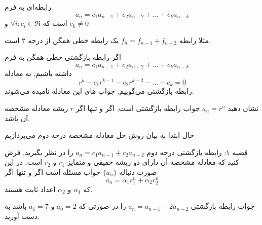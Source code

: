 \renewcommand{\thefootnote}{\arabic{footnote}}

\begin{definition}
    رابطه‌ای به فرم
   \[a_n=c_{1}a_{n-1}+c_{2}a_{n-2}+...+c_{k}a_{n-k}\]
   است که
   $\forall{i}:c_i \in \Re $
   و 
   $ c_k\neq 0$


\end{definition}

مثلا رابطه‌ 
$f_n=f_{n-1}+f_{n-2}$
یک رابطه‌ خطی همگن از درجه ۲ است.

\begin{definition}
    اگر رابطه‌ بازگشتی خطی همگن به فرم
    \[a_n=c_{1}a_{n-1}+c_{2}a_{n-2}+...+c_{k}a_{n-k}\]
    داشته باشیم, به معادله
    \[r^k-c_{1}r^{k-1}-c_{2}r^{k-2}-...-c_{k}=0\]
    رابطه‌ بازگشتی می‌گوییم.
     جواب های این معادله 
    نامیده می‌شوند.

\end{definition}
\begin{problem}
    نشان دهید
    $a_n=r^n$
    جواب رابطه‌ بازگشتی است, اگر و تنها اگر 
    $r$
    ریشه معادله مشخصه آن باشد.
\end{problem}
حال
ابتدا به بیان روش حل معادله مشخصه درجه دوم می‌پردازیم
\begin{theorem}
    قضیه ۱:
    رابطه‌ بازگشتی درجه دوم
    $a_n=c_1 a_{n-1}+c_2 a_{n-2}$
    را در نظر بگیرید, فرض کنید که معادله مشخصه آن دارای دو ریشه حقیقی و متمایز 
    $r_1$ و $r_2$
    است.
    در این صورت دنباله 
    $\{a_n\}$
    جواب مسئله است اگر و تنها اگر
    \[a_n=\alpha_1 r_1^n+\alpha_2 r_2^n\]
    که
    $\alpha_1$
    و
    $\alpha_2$
    اعداد ثابت هستند.

\end{theorem}
\begin{problem}
    جواب رابطه‌ بازگشتی 
    $a_n=a_{n-1}+2a_{n-2}$
    را در صورتی که
    $a_0=2$
    و
    $a_1=7$
    باشد به دست آورید.
\end{problem}
